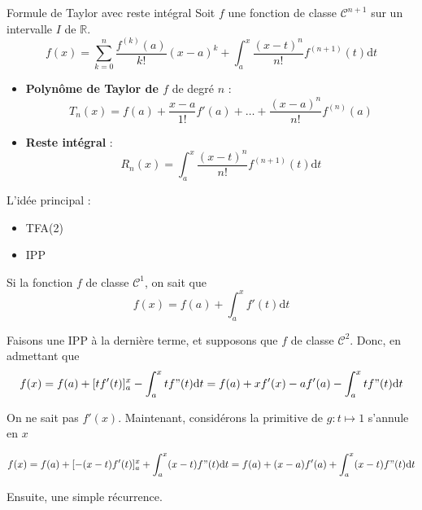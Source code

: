 \begin{Theorem}{Formule de Taylor avec reste intégral}{}
Soit $f$ une fonction de classe $\mathscr{C} ^{n+1}$ sur un intervalle $I$ de $\mathbb{R}$. 
\begin{equation}
  f(x) = \sum_{k=0}^{n} \frac{f ^{(k)}(a)}{k!} (x-a) ^{k} + \int_{a}^{x} \frac{(x-t) ^{n}
  }{n!}  f ^{(n+1)}(t) \mathrm{d}t
\end{equation}

\begin{itemize}

    \item \textbf{Polynôme de Taylor de $f$} de degré $n$ : 
      \begin{equation}
        T_n(x) = f(a) + \frac{x-a}{1!} f'(a) + \dots + \frac{(x-a) ^{n}}{n!} f ^{(n)}(a)
      \end{equation}

    \item \textbf{Reste intégral} : 
      \begin{equation}
        R_n(x) = \int_{
          a
        }^{x} \frac{(x-t) ^{n}}{n!} f ^{(n+1)} (t) \mathrm{d} t
      \end{equation}
\end{itemize}
\end{Theorem}

  \begin{note}{}{}
 L'idée principal : 
 \begin{itemize}

     \item TFA(2)
    \item IPP

 \end{itemize}
  \end{note}
\begin{myproof}{}{}


  

Si la fonction $f$ de classe $\mathscr{C} ^{1}$, on sait que 
\begin{equation}
  f(x) = f(a) + \int_{a}^{x} f'(t) \mathrm{d} t
\end{equation}

Faisons une IPP à la dernière terme, et supposons que $f$ de classe $\mathscr{C} ^{2}$. Donc, en admettant que 
\begin{equation}
  f(x) = f(a) + [tf'(t)] _a ^{x} - \int_{a}^{x} tf"(t) \mathrm{d}t = f(a) + xf'(x) - af'(a) - \int_{a}^{x} tf"(t) \mathrm{d}t
\end{equation}

On ne sait pas $f'(x)$. Maintenant, considérons la primitive de $g : t \mapsto 1$ s'annule en $x$

\begin{equation}
  f(x) = f(a) + [-(x-t)f'(t)] _a ^{x} + \int_{a}^{x}(x-t) f"(t) \mathrm{d}t = f(a) + (x-a) f'(a) + \int_{a}^{x} (x-t) f"(t) \mathrm{d}t
\end{equation}

Ensuite, une simple récurrence.
\end{myproof}

